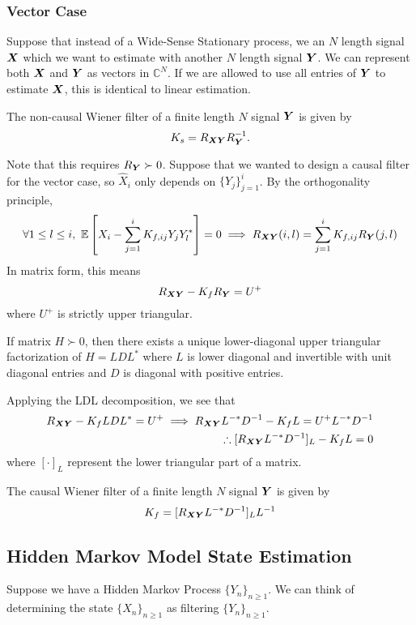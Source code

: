 \subsubsection{Vector Case}
Suppose that instead of a Wide-Sense Stationary process, we an $N$ length signal $\boldsymbol{X}$ which we want to estimate with another $N$ length signal $\boldsymbol{Y}$.
We can represent both $\boldsymbol{X}$ and $\boldsymbol{Y}$ as vectors in $\mathbb{C}^N$.
If we are allowed to use all entries of $\boldsymbol{Y}$ to estimate $\boldsymbol{X}$, this is identical to linear estimation.
\begin{definition}
	The non-causal Wiener filter of a finite length $N$ signal $\boldsymbol{Y}$ is given by \[
		K_s = R_{\boldsymbol{X}\boldsymbol{Y}}R_{\boldsymbol{Y}}^{-1}.
	\]
	\label{defn:noncausal-vector-wiener}
\end{definition}
Note that this requires $R_{\boldsymbol{Y}} \succ 0$.
Suppose that we wanted to design a causal filter for the vector case, so $\hat{X}_i$ only depends on $\{Y_j\}_{j=1}^i$.
By the orthogonality principle,
\[
	\forall 1 \leq l \leq i,\ \mathbb{E}\left[X_i - \sum_{j=1}^iK_{f, ij}Y_jY_l^*\right] = 0 \implies R_{\boldsymbol{XY}}(i, l) = \sum_{j=1}^i K_{f, ij}R_{\boldsymbol{Y}}(j, l)
\]
In matrix form, this means
\[
	R_{\boldsymbol{XY}} - K_fR_{\boldsymbol{Y}} = U^+
\]
where $U^+$ is strictly upper triangular.
\begin{theorem}
	If matrix $H \succ 0$, then there exists a unique lower-diagonal upper triangular factorization of $H=LDL^*$ where $L$ is lower diagonal and invertible with unit diagonal entries and $D$ is diagonal with positive entries.
	\label{thm:ldl-decomp}
\end{theorem}
Applying the LDL decomposition, we see that
\begin{align*}
	R_{\boldsymbol{XY}} - K_fLDL^* = U^+ \implies R_{\boldsymbol{XY}}L^{-*}D^{-1} -K_f L = U^+L^{-*}D^{-1}\\
	\therefore [R_{\boldsymbol{XY}}L^{-*}D^{-1}]_L -K_f L = 0
\end{align*}
where $[\cdot]_L$ represent the lower triangular part of a matrix.
\begin{definition}
	The causal Wiener filter of a finite length $N$ signal $\boldsymbol{Y}$ is given by \[
		K_f = [R_{\boldsymbol{XY}}L^{-*}D^{-1}]_LL^{-1}
	\]
	\label{defn:causal-vector-wiener}
\end{definition}
\subsection{Hidden Markov Model State Estimation}
Suppose we have a Hidden Markov Process $\{Y_n\}_{n\geq1}$.
We can think of determining the state $\{X_n\}_{n\geq1}$ as filtering $\{Y_n\}_{n\geq1}$.
